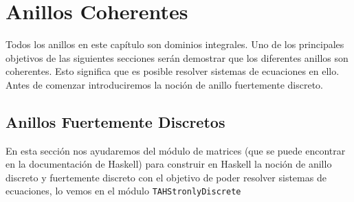 \chapter{Anillos Coherentes}\label{sec:coherentHas}
Todos los anillos en este capítulo son dominios integrales. Uno de los principales objetivos de las siguientes secciones serán demostrar que los diferentes anillos son coherentes. Esto significa que es posible resolver sistemas de ecuaciones en ello. Antes de comenzar introduciremos la noción de anillo fuertemente discreto.
\section{Anillos Fuertemente Discretos}
En esta sección nos ayudaremos del módulo de matrices (que se puede encontrar en la documentación de Haskell) para construir en Haskell la noción de anillo discreto y fuertemente discreto con el objetivo de poder resolver sistemas de ecuaciones, lo vemos en el módulo \texttt{TAHStronlyDiscrete} 


